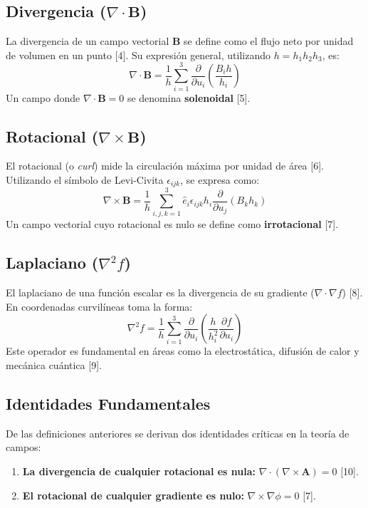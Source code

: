 \documentclass[a4paper]{article}
\begin{document}
\subsection{Divergencia ($\nabla \cdot \mathbf{B}$)}
La divergencia de un campo vectorial $\mathbf{B}$ se define como el flujo neto por unidad de volumen en un punto [4]. Su expresión general, utilizando $h = h_1 h_2 h_3$, es:
\begin{equation}
    \nabla \cdot \mathbf{B} = \frac{1}{h} \sum_{i=1}^3 \frac{\partial}{\partial u_i} \left( \frac{B_i h}{h_i} \right)
\end{equation}
Un campo donde $\nabla \cdot \mathbf{B} = 0$ se denomina \textbf{solenoidal} [5].

\subsection{Rotacional ($\nabla \times \mathbf{B}$)}
El rotacional (o \textit{curl}) mide la circulación máxima por unidad de área [6]. Utilizando el símbolo de Levi-Civita $\epsilon_{ijk}$, se expresa como:
\begin{equation}
    \nabla \times \mathbf{B} = \frac{1}{h} \sum_{i,j,k=1}^3 \hat{e}_i \epsilon_{ijk} h_i \frac{\partial}{\partial u_j} (B_k h_k)
\end{equation}
Un campo vectorial cuyo rotacional es nulo se define como \textbf{irrotacional} [7].

\subsection{Laplaciano ($\nabla^2 f$)}
El laplaciano de una función escalar es la divergencia de su gradiente ($\nabla \cdot \nabla f$) [8]. En coordenadas curvilíneas toma la forma:
\begin{equation}
    \nabla^2 f = \frac{1}{h} \sum_{i=1}^3 \frac{\partial}{\partial u_i} \left( \frac{h}{h_i^2} \frac{\partial f}{\partial u_i} \right)
\end{equation}
Este operador es fundamental en áreas como la electrostática, difusión de calor y mecánica cuántica [9].

\subsection{Identidades Fundamentales}
De las definiciones anteriores se derivan dos identidades críticas en la teoría de campos:
\begin{enumerate}
    \item \textbf{La divergencia de cualquier rotacional es nula:} $\nabla \cdot (\nabla \times \mathbf{A}) = 0$ [10].
    \item \textbf{El rotacional de cualquier gradiente es nulo:} $\nabla \times \nabla \phi = 0$ [7].
\end{enumerate}


 
\end{document}

